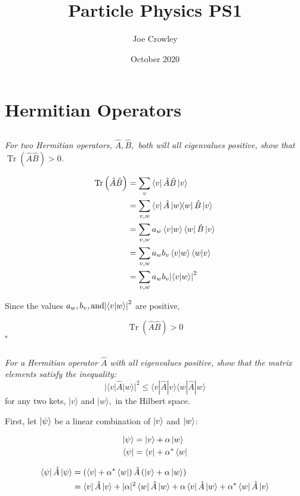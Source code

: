 \documentclass[12pt, letterpaper]{article}
\title{Particle Physics PS1}
\author{Joe Crowley}
\date{October 2020}
\newcommand*{\qed}{\null\nobreak\hfill\ensuremath{\square}}
\begin{document}
  

\section{Hermitian Operators}
\subsection{}
\textit{For two Hermitian operators, $\hat{A}, \hat{B},$ both will all eigenvalues positive, show that $\operatorname{Tr}(\hat{A} \hat{B})>0$. }

\begin{equation*}
\begin{split}
    \operatorname{Tr}\left(\hat{A}\hat{B}\right) &= \sum_v \bra{v}\hat{A}\hat{B}\ket{v}\\
    &= \sum_{v,w} \bra{v}\hat{A}\ketbra{w}\hat{B}\ket{v}\\
    &= \sum_{v,w} a_w\braket{v}{w}\bra{w}\hat{B}\ket{v}\\
    &= \sum_{v,w}  a_w b_v\braket{v}{w}\braket{w}{v}\\
    &= \sum_{v,w}  a_w b_v{\left|\braket{v}{w}\right| }^2
\end{split}
\end{equation*}

Since the values $ a_w, b_v, \text{and} {\left|\braket{v}{w}\right| }^2$ are positive, 

$$
    \operatorname{Tr}\left(\hat{A}\hat{B}\right) >0
$$
\qed

\subsection{}
\textit{For a Hermitian operator $\hat{A}$ with all eigenvalues positive, show that the matrix elements satisfy the inequality:}
$$
|\langle v|\hat{A}| w\rangle|^{2} \leq\langle v|\hat{A}| v\rangle\langle w|\hat{A}| w\rangle
$$ for any two kets, $|v\rangle$ and $|w\rangle,$ in the Hilbert space.

First, let $\ket{\psi}$ be a linear combination of $\ket{v}$ and $\ket{w}$:

\begin{align*}
    \ket{\psi} &= \ket{v} +\alpha \ket{w} \\
    \bra{\psi}&= \bra{v} +\alpha^* \bra{w}
\end{align*}

\begin{align*}
    \bra\psi \hat A \ket\psi&= \left(\bra{v} +\alpha^* \bra{w}\right) \hat A \left(\ket{v} +\alpha \ket{w}\right)\\
    & =\bra v\hat{A} \ket v+|\alpha|^{2} \bra w \hat{A}  \ket w + \alpha \bra  v\hat A \ket w+\alpha^{*}\bra w\hat{A} \ket v
\end{align*}
\end{document}
